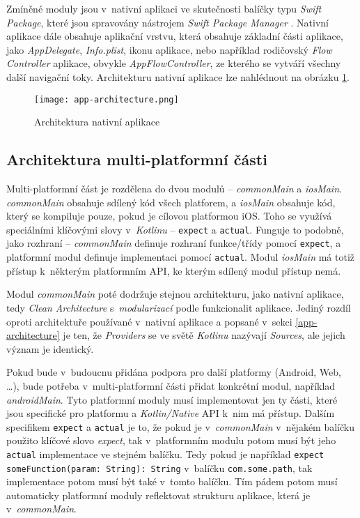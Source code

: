 Zmíněné moduly jsou v~nativní aplikaci ve skutečnosti balíčky typu \emph{Swift Package}, které jsou spravovány nástrojem \emph{Swift Package Manager} \cite{spm}. Nativní aplikace dále obsahuje aplikační vrstvu, která obsahuje základní části aplikace, jako \emph{AppDelegate}, \emph{Info.plist}, ikonu aplikace, nebo například rodičovský \emph{Flow Controller} aplikace, obvykle \emph{AppFlowController}, ze kterého se vytváří všechny další navigační toky. Architekturu nativní aplikace lze nahlédnout na obrázku \ref{fig:app-architecture}.

\begin{figure}[h]
	\centering
	\texttt{[image: app-architecture.png]}
	\caption{Architektura nativní aplikace}
	\label{fig:app-architecture}
\end{figure}

\subsection{Architektura multi-platformní části}

Multi-platformní část je rozdělena do dvou modulů – \emph{commonMain} a \emph{iosMain}. \emph{commonMain} obsahuje sdílený kód všech platforem, a \emph{iosMain} obsahuje kód, který se kompiluje pouze, pokud je cílovou platformou iOS. Toho se využívá speciálními klíčovými slovy v~\emph{Kotlinu} – \texttt{expect} a \texttt{actual}. Funguje to podobně, jako rozhraní – \emph{commonMain} definuje rozhraní funkce/třídy pomocí \texttt{expect}, a platformní modul definuje implementaci pomocí \texttt{actual}. Modul \emph{iosMain} má totiž přístup k~některým platformním API, ke kterým sdílený modul přístup nemá.

Modul \emph{commonMain} poté dodržuje stejnou architekturu, jako nativní aplikace, tedy \emph{Clean Architecture} s~\emph{modularizací} podle funkcionalit aplikace. Jediný rozdíl oproti architektuře používané v~nativní aplikace a popsané v~sekci \ref{app-architecture} je ten, že \emph{Providers} se ve světě \emph{Kotlinu} nazývají \emph{Sources}, ale jejich význam je identický.

Pokud bude v~budoucnu přidána podpora pro další platformy (Android, Web, \dots), bude potřeba v~multi-platformní části přidat konkrétní modul, například \emph{androidMain}. Tyto platformní moduly musí implementovat jen ty části, které jsou specifické pro platformu a \emph{Kotlin/Native} API k~nim má přístup. Dalším specifikem \texttt{expect} a \texttt{actual} je to, že pokud je v~\emph{commonMain} v~nějakém balíčku použito klíčové slovo \emph{expect}, tak v~platformním modulu potom musí být jeho \texttt{actual} implementace ve stejném balíčku. Tedy pokud je například \texttt{expect someFunction(param: String): String} v~balíčku \texttt{com.some.path}, tak implementace potom musí být také v~tomto balíčku. Tím pádem potom musí automaticky platformní moduly reflektovat strukturu aplikace, která je v~\emph{commonMain}.

